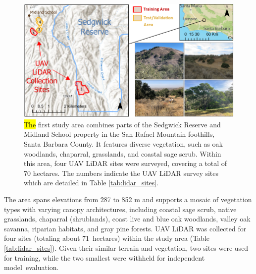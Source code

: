 \documentclass[remotesensing,article,accept,pdftex,moreauthors]{Definitions/mdpi}
\begin{document}
\begin{figure}[H]
  \includegraphics[width=0.95\linewidth]{figures/Sedgwick_Reserve_Study_Area.png}
    \caption{\hl{The} %
 first study area combines parts of the Sedgwick Reserve and Midland School property in the San Rafael Mountain foothills, Santa Barbara County. It features diverse vegetation, such as oak woodlands, chaparral, grasslands, and coastal sage scrub. Within this area, four UAV LiDAR sites were surveyed, covering a total of 70 hectares. The numbers indicate the UAV LiDAR survey sites which are detailed in Table \ref{tab:lidar_sites}.}
  \label{fig:sedgwick_study_area}
\end{figure}

The area spans elevations from 287 to 852 m and supports a mosaic of vegetation types with varying canopy architectures, including coastal sage scrub, native grasslands, chaparral (shrublands), coast live and blue oak woodlands, valley oak savanna, riparian habitats, and gray pine forests. UAV LiDAR was collected for four sites (totaling about \mbox{71 hectares}) within the study area (Table \ref{tab:lidar_sites}). Given their similar terrain and vegetation, two sites were used for training, while the two smallest were withheld for independent \mbox{model evaluation}.


\end{document}
